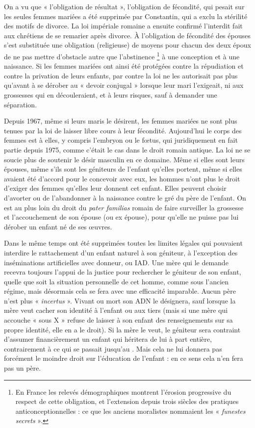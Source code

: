  On a vu que « l'obligation de résultat », l'obligation de fécondité, qui pesait sur les seules femmes mariées a été supprimée par Constantin, qui a exclu la stérilité des motifs de divorce. La loi impériale romaine a ensuite confirmé l'interdit fait aux chrétiens de se remarier après divorce. À l'obligation de fécondité des épouses s'est substituée une obligation (religieuse) de moyens pour chacun des deux époux de ne pas mettre d'obstacle autre que l'abstinence 
\footnote{En France les relevés démographiques montrent l'érosion progressive du respect de cette obligation, et l'extension depuis trois siècles des pratiques anticonceptionnelles : ce que les anciens moralistes nommaient les « \emph{funestes secrets} ».} 
à une conception et à une naissance. Si les femmes mariées ont ainsi été protégées contre la répudiation et contre la privation de leurs enfants, par contre la loi ne les autorisait pas plus qu'avant à se dérober au « devoir conjugal » lorsque leur mari l'exigeait, ni aux grossesses qui en découleraient, et à leurs risques, sauf à demander une séparation. 

 Depuis 1967, même si leurs maris le désirent, les femmes mariées ne sont plus tenues par la loi de laisser libre cours à leur fécondité. Aujourd'hui le corps des femmes est à elles, y compris l'embryon ou le fœtus, qui juridiquement en fait partie depuis 1975, comme c'était le cas dans le droit romain antique. La loi ne se soucie plus de soutenir le désir masculin en ce domaine. Même si elles sont leurs épouses, même s'ils sont les géniteurs de l'enfant qu'elles portent, même si elles avaient été d'accord pour le concevoir avec eux, les hommes n'ont plus le droit d'exiger des femmes qu'elles leur donnent cet enfant. Elles peuvent choisir d'avorter ou de l'abandonner à la naissance contre le gré du père de l'enfant. On est au plus loin du droit du \emph{pater familias} romain de faire surveiller la grossesse et l'accouchement de son épouse (ou ex épouse), pour qu'elle ne puisse pas lui dérober un enfant né de ses œuvres.

 Dans le même temps ont été supprimées toutes les limites légales qui pouvaient interdire le rattachement d'un enfant naturel à son géniteur, à l'exception des inséminations artificielles avec donneur, ou IAD. Une mère qui le demande recevra toujours l'appui de la justice pour rechercher le géniteur de son enfant, quelle que soit la situation personnelle de cet homme, comme sous l'ancien régime, mais désormais cela se fera avec une efficacité  imparable. Aucun père n'est plus « \emph{incertus} ». Vivant ou mort son ADN le désignera, sauf lorsque la mère veut cacher son identité à l'enfant ou aux tiers (mais si une mère qui accouche « sous X » refuse de laisser à son enfant des renseignements sur sa propre identité, elle en a le droit). Si la mère le veut, le géniteur sera contraint d'assumer financièrement un enfant qui héritera de lui à part entière, contrairement à ce qui se passait jusqu'au . Mais cela ne lui donnera pas forcément le moindre droit sur l'éducation de l'enfant : en ce sens cela n'en fera pas un père.

